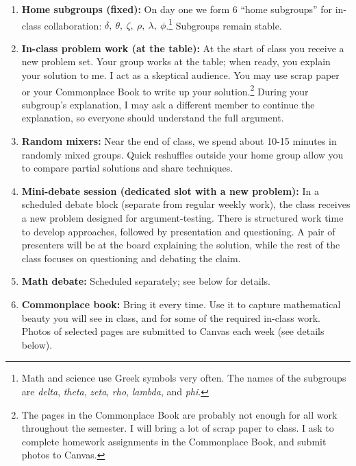 \documentclass[oneside,11pt]{amsart}
\begin{document}
\begin{enumerate}[$\bullet$]
  \item \textbf{Home subgroups (fixed):} On day one we form 6 ``home subgroups'' for in-class collaboration:
  $\delta, \ \theta, \ \zeta, \ \rho, \ \lambda, \ \phi$.\footnote{Math and science use Greek symbols very often. The names of the subgroups are 
	\emph{delta}, \emph{theta}, \emph{zeta}, \emph{rho}, \emph{lambda}, and \emph{phi}.}
	Subgroups remain stable.

  \item \textbf{In-class problem work (at the table):} At
	the start of class you receive a new problem set.
	Your group works at the table; when ready, you explain
	your solution to me. I act as a skeptical audience.
	You may use scrap paper or your Commonplace Book to write up your solution.\footnote{The pages
	in the Commonplace Book are probably not enough for all work throughout the semester. I will bring
	a lot of scrap paper to class. I ask to complete homework assignments in the Commonplace Book, and
	submit photos to Canvas.}
	During your subgroup's explanation, I may ask a different member to continue the explanation,
	so everyone should understand the full argument.

  \item \textbf{Random mixers:} 
		Near the end of class, we spend about 10-15 minutes 
		in randomly mixed groups.
		Quick reshuffles outside your home group allow you
		to compare partial solutions and share techniques.
		
	 \item \textbf{Mini-debate session (dedicated slot with a new
	 problem):} In a scheduled debate block (separate from
	 regular weekly work), the class receives a {new}
	 problem designed for argument-testing. There is
	 structured {work time} to develop approaches,
	 followed by {presentation and questioning}. 
	 A pair of presenters will be at the board explaining the
	 solution, while the rest of the class 
	 focuses on questioning and debating the claim.
  
	\item \textbf{Math debate:} Scheduled separately; see below for details.

	\item \textbf{Commonplace book:} Bring it every time.
	Use it to capture mathematical beauty you will see in class, and for 
	some of the required in-class work.
	Photos of selected pages
	are submitted to Canvas each week (see details below).


\end{enumerate}
\end{document}
